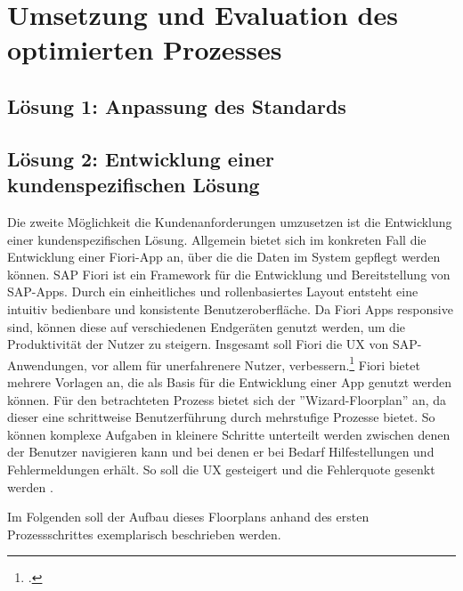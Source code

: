 \chapter{Umsetzung und Evaluation des optimierten Prozesses}



\section{Lösung 1: Anpassung des Standards}



\section{Lösung 2: Entwicklung einer kundenspezifischen Lösung}

Die zweite Möglichkeit die Kundenanforderungen umzusetzen ist die Entwicklung einer kundenspezifischen Lösung. Allgemein bietet sich im konkreten Fall die Entwicklung einer Fiori-App an, über die die Daten im System gepflegt werden können. SAP Fiori ist ein Framework für die Entwicklung und Bereitstellung von SAP-Apps. Durch ein einheitliches und rollenbasiertes Layout entsteht eine intuitiv bedienbare und konsistente Benutzeroberfläche. Da Fiori Apps responsive sind, können diese auf verschiedenen Endgeräten genutzt werden, um die Produktivität der Nutzer zu steigern. Insgesamt soll Fiori die UX von SAP-Anwendungen, vor allem für unerfahrenere Nutzer, verbessern.\footcite[Vgl.][]{praxis_sap_fiori_allgemein_2024} Fiori bietet mehrere Vorlagen an, die als Basis für die Entwicklung einer App genutzt werden können. Für den betrachteten Prozess bietet sich der ''Wizard-Floorplan'' an, da dieser eine schrittweise Benutzerführung durch mehrstufige Prozesse bietet. So können komplexe Aufgaben in kleinere Schritte unterteilt werden zwischen denen der Benutzer navigieren kann und bei denen er bei Bedarf Hilfestellungen und Fehlermeldungen erhält. So soll die UX gesteigert und die Fehlerquote gesenkt werden \parencite[Vgl.][]{praxis_sap_wizard_floorplan_2024}.

Im Folgenden soll der Aufbau dieses Floorplans anhand des ersten Prozessschrittes exemplarisch beschrieben werden.

